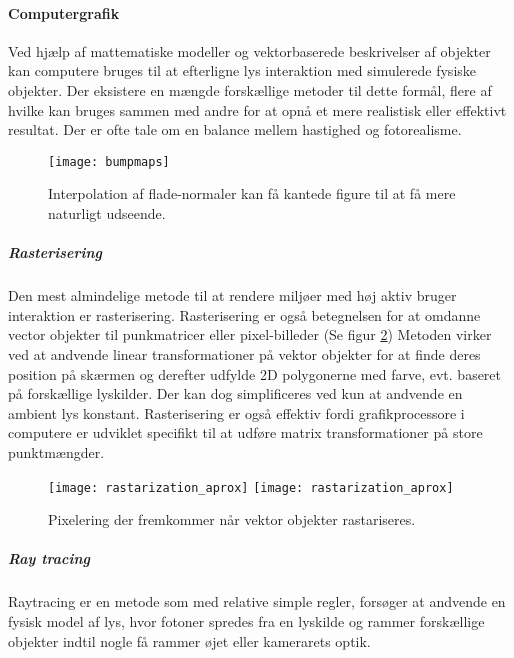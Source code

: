 \paragraph{Computergrafik}
Ved hjælp af mattematiske modeller og vektorbaserede beskrivelser af objekter kan computere bruges til at efterligne lys interaktion med simulerede fysiske objekter. Der eksistere en mængde forskællige metoder til dette formål, flere af hvilke kan bruges sammen med andre for at opnå et mere realistisk eller effektivt resultat. Der er ofte tale om en balance mellem hastighed og fotorealisme.
\begin{figure}[H]
    \centering
    \texttt{[image: bumpmaps]}
    \caption{Interpolation af flade-normaler kan få kantede figure til at få mere naturligt udseende.}
    \label{fig:tid_versus_kvalitet}
\end{figure}
\subparagraph{Rasterisering}
Den mest almindelige metode til at rendere miljøer med høj aktiv bruger interaktion er rasterisering. Rasterisering er også betegnelsen for at omdanne vector objekter til punkmatricer eller pixel-billeder (Se figur \ref{fig:pixelering}) Metoden virker ved at andvende linear transformationer på vektor objekter for at finde deres position på skærmen og derefter udfylde 2D polygonerne med farve, evt. baseret på forskællige lyskilder. Der kan dog simplificeres ved kun at andvende en ambient lys konstant. Rasterisering er også effektiv fordi grafikprocessore i computere er udviklet specifikt til at udføre matrix transformationer på store punktmængder.
\begin{figure}[H]
    \centering
    \texttt{[image: rastarization\_aprox]}
    \texttt{[image: rastarization\_aprox]}
    \caption{Pixelering der fremkommer når vektor objekter rastariseres.}
    \label{fig:pixelering}
\end{figure}
\subparagraph{Ray tracing}
% 
Raytracing er en metode som med relative simple regler, forsøger at andvende en fysisk model af lys, hvor fotoner spredes fra en lyskilde og rammer forskællige objekter indtil nogle få rammer øjet eller kamerarets optik. 
